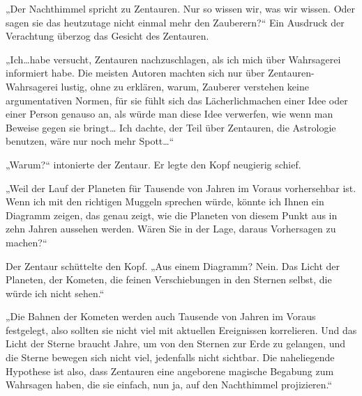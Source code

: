 „Der Nachthimmel spricht zu Zentauren. Nur so wissen wir, was wir wissen. Oder sagen sie das heutzutage nicht einmal mehr den Zauberern?“
Ein Ausdruck der Verachtung überzog das Gesicht des Zentauren.

„Ich…habe versucht, Zentauren nachzuschlagen, als ich mich über Wahrsagerei informiert habe. Die meisten Autoren machten sich nur über Zentauren-Wahrsagerei lustig, ohne zu erklären, warum, Zauberer verstehen keine argumentativen Normen, für sie fühlt sich das Lächerlichmachen einer Idee oder einer Person genauso an, als würde man diese Idee verwerfen, wie wenn man Beweise gegen sie bringt… Ich dachte, der Teil über Zentauren, die Astrologie benutzen, wäre nur noch mehr Spott…“

„Warum?“ intonierte der Zentaur. Er legte den Kopf neugierig schief.

„Weil der Lauf der Planeten für Tausende von Jahren im Voraus vorhersehbar ist. Wenn ich mit den richtigen Muggeln sprechen würde, könnte ich Ihnen ein Diagramm zeigen, das genau zeigt, wie die Planeten von diesem Punkt aus in zehn Jahren aussehen werden. Wären Sie in der Lage, daraus Vorhersagen zu machen?“

Der Zentaur schüttelte den Kopf. „Aus einem Diagramm? Nein. Das Licht der Planeten, der Kometen, die feinen Verschiebungen in den Sternen selbst, die würde ich nicht sehen.“

„Die Bahnen der Kometen werden auch Tausende von Jahren im Voraus festgelegt, also sollten sie nicht viel mit aktuellen Ereignissen korrelieren. Und das Licht der Sterne braucht Jahre, um von den Sternen zur Erde zu gelangen, und die Sterne bewegen sich nicht viel, jedenfalls nicht sichtbar. Die naheliegende Hypothese ist also, dass Zentauren eine angeborene magische Begabung zum Wahrsagen haben, die sie einfach, nun ja, auf den Nachthimmel projizieren.“


